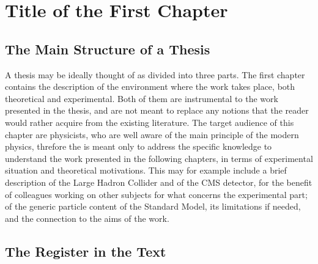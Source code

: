 \chapter{Title of the First Chapter}



\section{The Main Structure of a Thesis}

A thesis may be ideally thought of as divided into three parts.
The first chapter contains the description of the environment where the work takes place,
both theoretical and experimental.
Both of them are instrumental to the work presented in the thesis, 
and are not meant to replace any notions that the reader would rather acquire 
from the existing literature.
The target audience of this chapter are physicists,
who are well aware of the main principle of the modern physics,
threfore the is meant only to address the specific knowledge to understand the work presented
in the following chapters,
in terms of experimental situation and theoretical motivations.
This may for example include a brief description of the Large Hadron Collider
and of the CMS detector, for the benefit of colleagues working on other subjects
for what concerns the experimental part; 
of the generic particle content of the Standard Model,
its limitations if needed,
and the connection to the aims of the work. \cite{2006MNRAS.372..961K}


\section{The Register in the Text}

